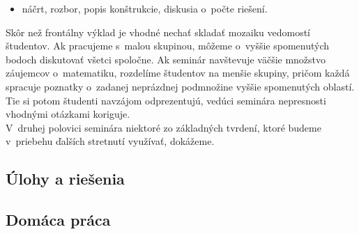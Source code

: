 {\begin{itemize}
\begin{itemize}
\item náčrt, rozbor, popis konštrukcie, diskusia o~počte riešení.
\end{itemize}
\end{itemize}
\kom Skôr než frontálny výklad je vhodné nechať skladať mozaiku vedomostí študentov. Ak pracujeme s~malou skupinou, môžeme o~vyššie spomenutých bodoch diskutovať všetci spoločne. Ak seminár navštevuje väčšie množstvo záujemcov o~matematiku, rozdelíme študentov na menšie skupiny, pričom každá spracuje poznatky o~zadanej neprázdnej podmnožine vyššie spomenutých oblastí. Tie si potom študenti navzájom odprezentujú, vedúci seminára nepresnosti vhodnými otázkami koriguje.
\\
\kom V~druhej polovici seminára niektoré zo základných tvrdení, ktoré budeme v~priebehu ďalších stretnutí využívať, dokážeme.\\
}

\subsection*{Úlohy a riešenia}

















\subsection*{Domáca práca}









